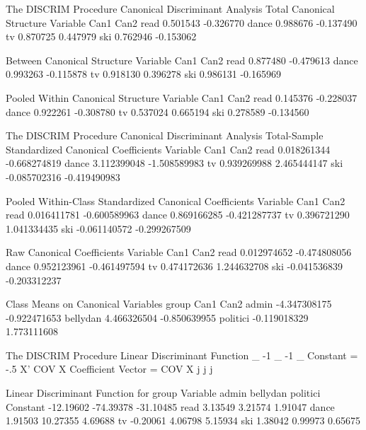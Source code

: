 \documentclass{article}
\begin{document}
\begin{Woutput}
The DISCRIM Procedure
Canonical Discriminant Analysis
         Total Canonical Structure
Variable              Can1              Can2
read              0.501543         -0.326770
dance             0.988676         -0.137490
tv                0.870725          0.447979
ski               0.762946         -0.153062

        Between Canonical Structure
Variable              Can1              Can2
read              0.877480         -0.479613
dance             0.993263         -0.115878
tv                0.918130          0.396278
ski               0.986131         -0.165969

     Pooled Within Canonical Structure
Variable              Can1              Can2
read              0.145376         -0.228037
dance             0.922261         -0.308780
tv                0.537024          0.665194
ski               0.278589         -0.134560

The DISCRIM Procedure
Canonical Discriminant Analysis
Total-Sample Standardized Canonical Coefficients
Variable              Can1              Can2
read           0.018261344      -0.668274819
dance          3.112399048      -1.508589983
tv             0.939269988       2.465444147
ski           -0.085702316      -0.419490983

Pooled Within-Class Standardized Canonical Coefficients
Variable              Can1              Can2
read           0.016411781      -0.600589963
dance          0.869166285      -0.421287737
tv             0.396721290       1.041334435
ski           -0.061140572      -0.299267509

         Raw Canonical Coefficients
Variable              Can1              Can2
read           0.012974652      -0.474808056
dance          0.952123961      -0.461497594
tv             0.474172636       1.244632708
ski           -0.041536839      -0.203312237

     Class Means on Canonical Variables
group                 Can1              Can2
admin         -4.347308175      -0.922471653
bellydan       4.466326504      -0.850639955
politici      -0.119018329       1.773111608

The DISCRIM Procedure
Linear Discriminant Function
               _     -1 _                              -1 _
Constant = -.5 X' COV   X      Coefficient Vector = COV   X
                j        j                                 j

      Linear Discriminant Function for group
Variable         admin      bellydan      politici
Constant     -12.19602     -74.39378     -31.10485
read           3.13549       3.21574       1.91047
dance          1.91503      10.27355       4.69688
tv            -0.20061       4.06798       5.15934
ski            1.38042       0.99973       0.65675


\end{Woutput}
\end{document}

